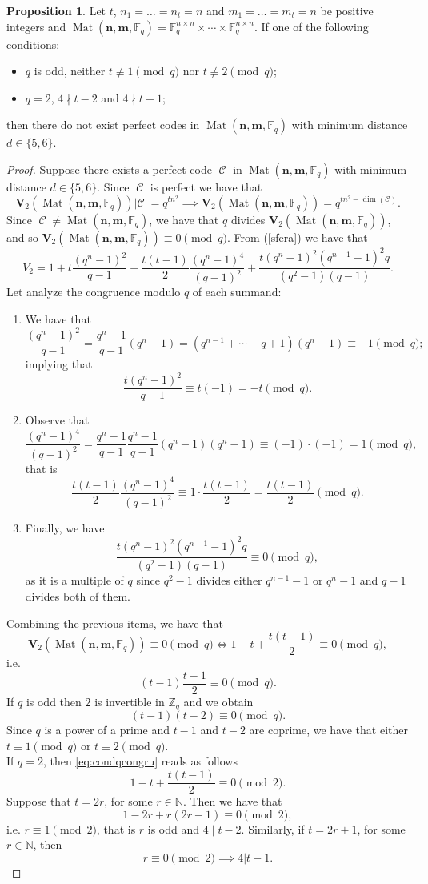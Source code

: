 \documentclass[11pt]{amsart}
\DeclareMathOperator{\C}{\mathcal{C}}
\DeclareMathOperator{\Mat}{Mat}
\theoremstyle{definition}
\newtheorem{proposition}[theorem]{Proposition}
\newcommand{\F}{{\mathbb F}}
\newcommand{\NN}{{\mathbb N}}
\newcommand{\bfn}{\mathbf {n}}
\newcommand{\bfm}{\mathbf {m}}
\newcommand{\spacmn}{\Mat(\bfn,\bfm,\F_q)}
\begin{document}
\begin{proposition}\label{prop:d-1/2=2}
Let $t$, $ n_1 = \ldots = n_t = n $ and $ m_1 = \ldots = m_t = n $ be positive integers and $\spacmn=\mathbb{F}_q^{n\times n}\times \cdots \times \mathbb{F}_q^{n\times n}$.
If one of the following conditions:
\begin{itemize}
    \item $q$ is odd, neither $t\not\equiv1\pmod{q}$ nor $t\not\equiv2\pmod{q}$;
    \item $q=2$, $4 \nmid t-2$ and $4 \nmid t-1$;
\end{itemize}
then there do not exist perfect codes in $\spacmn$ with minimum distance $d \in \{5,6\}$.
\end{proposition}
\begin{proof}
Suppose there exists a perfect code $\C$ in $\spacmn$ with minimum distance $d \in \{5,6\}$.
Since $\C$ is perfect we have that
\[
\mathbf{V}_2(\spacmn)\lvert\mathcal{C}\rvert=q^{tn^2}\implies \mathbf{V}_2(\spacmn)=q^{tn^2-\dim(\mathcal{C})}.
\]
Since $\C \ne \spacmn$, we have that $q$ divides $\mathbf{V}_2(\spacmn)$, and so $\mathbf{V}_2(\spacmn)\equiv0\pmod{q}$. 
From (\ref{sfera}) we have that
\[
V_2=1+t\frac{(q^n-1)^2}{q-1}+\frac{t(t-1)}{2}\frac{(q^n-1)^4}{(q-1)^2}+\frac{t(q^n-1)^2(q^{n-1}-1)^2q}{(q^2-1)(q-1)}.
\]
Let analyze the congruence modulo $q$ of each summand:
\begin{enumerate}
\item[(1)] We have that
\[
\frac{(q^n-1)^2}{q-1}=\frac{q^n-1}{q-1}(q^n-1)=(q^{n-1}+\cdots+q+1)(q^n-1)\equiv -1\pmod{q};
\]
implying that
\[
\frac{t(q^n-1)^2}{q-1}\equiv t(-1)=-t\pmod{q}.
\]
\item[(2)] Observe that
\[
\frac{(q^n-1)^4}{(q-1)^2}=\frac{q^n-1}{q-1}\frac{q^n-1}{q-1}(q^n-1)(q^n-1)\equiv (-1)\cdot(-1)=1\pmod{q},
\]
that is
\[
\frac{t(t-1)}{2}\frac{(q^n-1)^4}{(q-1)^2}\equiv 1\cdot \frac{t(t-1)}{2}=\frac{t(t-1)}{2}\pmod{q}.
\]
\item[3] Finally, we have
\[
\frac{t(q^n-1)^2(q^{n-1}-1)^2q}{(q^2-1)(q-1)}\equiv0 \pmod{q},
\]
as it is a multiple of $q$ since $q^2-1$ divides either $q^{n-1}-1$ or $q^n-1$ and $q-1$ divides both of them.
\end{enumerate}
Combining the previous items, we have that
\[
\mathbf{V}_2(\spacmn)\equiv0\pmod{q}\iff 1-t+\frac{t(t-1)}{2}\equiv0\pmod{q},
\]
i.e.
\begin{equation}\label{eq:condqcongru}
(t-1)\frac{t-1}{2}\equiv0\pmod q.
\end{equation}
If $q$ is odd then $2$ is invertible in $\mathbb{Z}_q$ and we obtain
\[
(t-1)(t-2)\equiv0\pmod q.
\]
Since $q$ is a power of a prime and $t-1$ and $t-2$ are coprime, we have that either $t\equiv1\pmod{q}$ or $t\equiv2\pmod{q}$.\\
If $q=2$, then \eqref{eq:condqcongru} reads as follows
\[
1-t+\frac{t(t-1)}{2}\equiv0\pmod{2}.
\]
Suppose that $t=2r$, for some $r \in \NN$. Then we have that
\[
1-2r+r(2r-1)\equiv0\pmod{2},
\]
i.e. $r\equiv1\pmod{2}$, that is $r$ is odd and $4\mid t-2$.
Similarly, if $t=2r+1$, for some $r \in \NN$, then
\[
r\equiv0\pmod{2}\implies 4|t-1.
\]
\end{proof}
\end{document}

